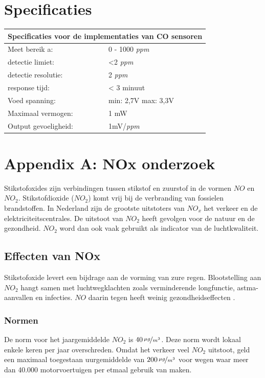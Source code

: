 \documentclass[a4paper, 11pt]{article} %
\begin{document}
\section{Specificaties}
\begin{center}
	\begin{tabular}{ | m{5cm} | m{5cm}| } 
		\hline
		\multicolumn{2}{|c|}{Specificaties voor de implementaties van CO sensoren} \\
		\hline
		Meet bereik a: & 0 - 1000 \textit{ppm} \\
		\hline
		detectie limiet:  & <2 \textit{ppm}
		\\ 
		\hline
		detectie resolutie: & 2 \textit{ppm} 
		\\ 
		\hline
		response tijd: & < 3 minuut
		\\ 
		\hline
		Voed spanning: & min: 2,7V max: 3,3V
		\\ 
		\hline
		Maximaal vermogen: & 1 mW
		\\
		\hline
		Output gevoeligheid: & 1mV/\textit{ppm}
		\\
		\hline
	\end{tabular}
\end{center}

\newpage
\appendix
\section{Appendix A: NOx onderzoek}
Stikstofoxides zijn verbindingen tussen stikstof en zuurstof in de vormen $NO$ en $NO_2$. Stikstofdioxide ($NO_2$) komt vrij bij de verbranding van fossielen brandstoffen. In Nederland zijn de grootste uitstoters van $NO_x$ het verkeer en de elektriciteitscentrales.  De uitstoot van $NO_2$ heeft gevolgen voor de natuur en de gezondheid. $NO_2$ word dan ook vaak gebruikt als indicator van de luchtkwaliteit.

\subsection{Effecten van NOx}
Stikstofoxide levert een bijdrage aan de vorming van zure regen. Blootstelling aan $NO_2$ hangt samen met luchtwegklachten zoals verminderende longfunctie, astma-aanvallen en infecties. $NO$ daarin tegen heeft weinig gezondheidseffecten \cite{NO2_Amsterdam}. 


\subsubsection{Normen}
De norm voor het jaargemiddelde $NO_2$ is 	$40\,\nicefrac{\mu g}{m^{3}}$. Deze norm wordt lokaal enkele keren per jaar overschreden. Omdat het verkeer veel $NO_2$ uitstoot, geld een maximaal toegestaan uurgemiddelde van $200\,\nicefrac{\mu g}{m^{3}}$ voor wegen waar meer dan 40.000 motorvoertuigen per etmaal gebruik van maken.
\end{document}
